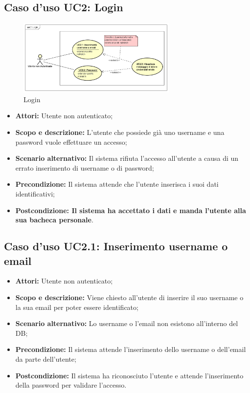 \documentclass[12pt,a4paper,titlepage]{article}
\begin{document}
	\subsection{Caso d'uso UC2: Login}
	\label{UC2}
	\begin{figure}[H]
		\centering
		\includegraphics[width=0.7\textwidth]{UseCase/Login}
		\caption{Login}
	\end{figure}
	\begin{itemize}
		\item \textbf{Attori:} Utente non autenticato;
		\item \textbf{Scopo e descrizione:} L'utente che possiede già uno username e una password vuole effettuare un accesso;
		\item \textbf{Scenario alternativo: }Il sistema rifiuta l'accesso all'utente a causa di un errato inserimento di username o di password;
		\item \textbf{Precondizione: }Il sistema attende che l'utente inserisca i suoi dati identificativi;
		\item \textbf{Postcondizione: Il sistema ha accettato i dati e manda l'utente alla sua bacheca personale}.
	\end{itemize}
	\subsection{Caso d'uso UC2.1: Inserimento username o email}
	\label{UC2.1}
	\begin{itemize}
		\item \textbf{Attori: }Utente non autenticato;
		\item \textbf{Scopo e descrizione: }Viene chiesto all'utente di inserire il suo username o la sua email per poter essere identificato;
		\item \textbf{Scenario alternativo: }Lo username o l'email non esistono all'interno del DB;
		\item \textbf{Precondizione: }Il sistema attende l'inserimento dello username o dell'email da parte dell'utente;
		\item \textbf{Postcondizione: }Il sistema ha riconosciuto l'utente e attende l'inserimento della password per validare l'accesso.
	\end{itemize}
\end{document}
